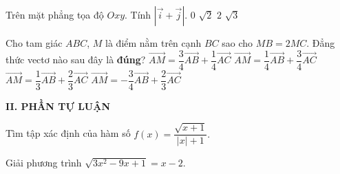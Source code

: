 \begin{ex}%
	Trên mặt phẳng tọa độ $Oxy$. Tính $|\vec{i}+\vec{j}|$.
	\choice
	{ $0$}
	{\True $ \sqrt{2}$}
	{$ 2$}
	{$ \sqrt{3}$}
\end{ex}

\begin{ex}%
	Cho tam giác $ABC$, $M$ là điểm nằm trên cạnh $BC$ sao cho $MB=2MC$. Đẳng thức vectơ nào sau đây là \textbf{đúng}?
	\choice
	{ $\vec{AM}=\dfrac{3}{4}\vec{AB}+\dfrac{1}{4}\vec{AC}$}
	{$ \vec{AM}=\dfrac{1}{4}\vec{AB}+\dfrac{3}{4}\vec{AC}$}
	{\True $ \vec{AM}=\dfrac{1}{3}\vec{AB}+\dfrac{2}{3}\vec{AC}$}
	{$ \vec{AM}=-\dfrac{3}{4}\vec{AB}+\dfrac{2}{3}\vec{AC}$}
\end{ex}

\noindent\textbf{II. PHẦN TỰ LUẬN}
\begin{bt}%
	Tìm tập xác định của hàm số $f(x)=\dfrac{\sqrt{x+1}}{|x|+1}.$
	\loigiai{ Hàm số xác định khi và chỉ khi
		$\heva{&x+1\geq 0\\&|x|+1\neq 0} \Leftrightarrow x\geq -1$.\\
		Vậy, $\mathscr{D}=\left[-1;+\infty\right).$
		
	}
\end{bt}

\begin{bt}%
	Giải phương trình $\sqrt{3x^2-9x+1}=x-2.$
	
\end{bt}

